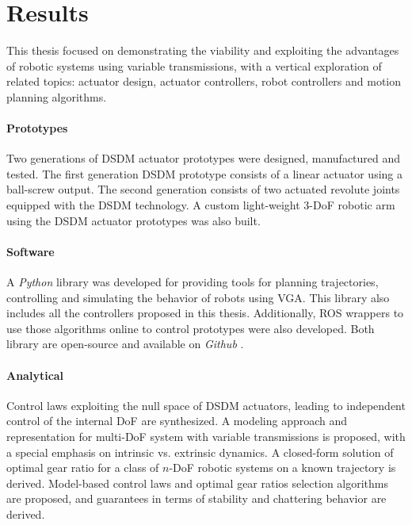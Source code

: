 \newpage

\section{Results}
\label{sec:mainresults}


This thesis focused on demonstrating the viability and exploiting the advantages of robotic systems using variable transmissions, with a vertical exploration of related topics: actuator design, actuator controllers, robot controllers and motion planning algorithms.

\paragraph{Prototypes}
%
Two generations of DSDM actuator prototypes were designed, manufactured and tested. The first generation DSDM prototype consists of a linear actuator using a ball-screw output. The second generation consists of two actuated revolute joints equipped with the DSDM technology. A custom light-weight 3-DoF robotic arm using the DSDM actuator prototypes was also built. %

\paragraph{Software}
%
A \emph{Python} library was developed for providing tools for planning trajectories, controlling and simulating the behavior of robots using VGA. This library also includes all the controllers proposed in this thesis. Additionally, ROS wrappers to use those algorithms online to control prototypes were also developed. Both library are open-source and available on \emph{Github} \cite{girard_github.com/alx87grd/alexrobotics_2017}\cite{girard_github.com/alx87grd/dsdm_robotics_ros_2017}.


\paragraph{Analytical}
%
Control laws exploiting the null space of DSDM actuators, leading to independent control of the internal DoF are synthesized. A modeling approach and representation for multi-DoF system with variable transmissions is proposed, with a special emphasis on intrinsic vs. extrinsic dynamics. A closed-form solution of optimal gear ratio for a class of $n$-DoF robotic systems on a known trajectory is derived. Model-based control laws and optimal gear ratios selection algorithms are proposed, and guarantees in terms of stability and chattering behavior are derived.


